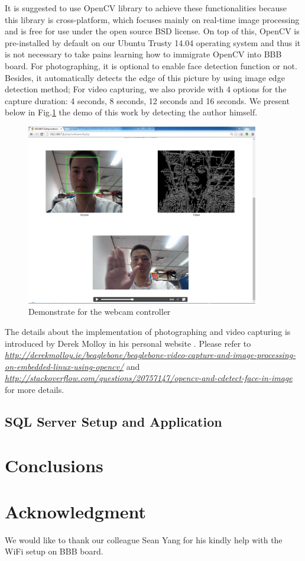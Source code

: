 \documentclass[12pt,journal,draftclsnofoot,onecolumn]{IEEEtran}
\begin{document}
It is suggested to use OpenCV library to achieve these functionalities because this library is cross-platform, which focuses mainly on real-time image processing and is free for use under the open source BSD license.
On top of this, OpenCV is pre-installed by default on our Ubuntu Trusty 14.04 operating system and thus it is not necessary to take pains learning how to immigrate OpenCV into BBB board. For photographing, it is optional to enable face detection function or not. Besides, it automatically detects the edge of this picture by using image edge detection method;  For video capturing, we also provide with 4 options for the capture duration: 4 seconds, 8 seconds, 12 seconds and 16 seconds.  We present below in Fig.\ref{webcamdemo} the demo of this work by detecting the author himself.
\begin{figure}[htb]
	\centering
	\includegraphics[width=4in]{./figs/webcam3.PNG}
	\caption{Demonstrate for the webcam controller}
	\label{webcamdemo}
\end{figure}

The details about the implementation of photographing and video capturing is introduced by Derek Molloy in his personal website \cite{molloy}. Please refer to \textcolor{blue}{\textit{\url{http://derekmolloy.ie/beaglebone/beaglebone-video-capture-and-image-processing-on-embedded-linux-using-opencv/}}} and \textcolor{blue}{\textit{\url{http://stackoverflow.com/questions/20757147/opencv-and-cdetect-face-in-image}}} for more details.


\subsection{SQL Server Setup and Application}\label{Sql}

	
\section{Conclusions}\label{Con}

\section*{Acknowledgment}
We would like to thank our colleague Sean Yang  for his kindly help with the WiFi setup on BBB board.



\end{document}
